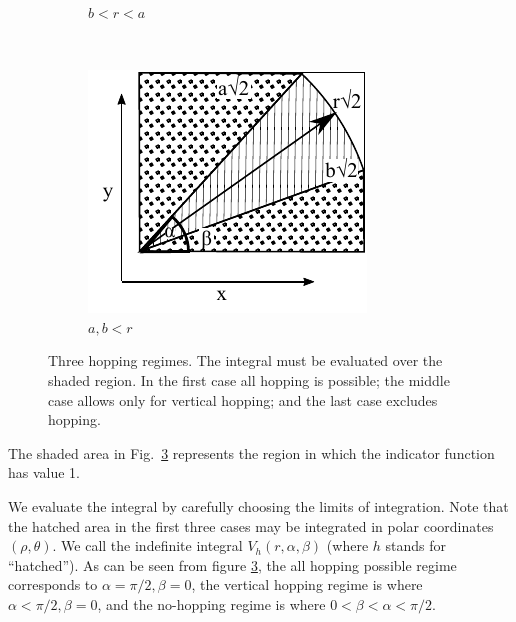 \documentclass[superscriptaddress,pre,reprint,showpacs,twocolumn]{revtex4-1}
\begin{document}
\begin{figure}[h]
\begin{subfigure}[b]{0.32\textwidth}
          \caption{$b<r<a$}
          \label{Caso2}
        \end{subfigure}%
        ~ %
        \begin{subfigure}[b]{0.32\textwidth}
          \centering
          \includegraphics[width=\textwidth]{figures/DiagramaIntegraCaso3.pdf}
          \caption{$a,b<r$}
          \label{Caso3}
        \end{subfigure}%
        \caption{Three hopping regimes. The integral must be evaluated over the shaded region.
In the first case all hopping is possible; the middle case
          allows only for vertical hopping; and the last case excludes hopping.}
\label{CasosIntegra}
\end{figure}
The shaded area in Fig.~\ref{CasosIntegra} represents the region in which the indicator function
has value 1. 

We evaluate the integral by carefully choosing the limits of integration. Note
that the hatched area in the first three cases may be integrated in polar coordinates $(\rho, \theta)$.
We call the indefinite integral $V_h(r,\alpha,\beta)$ (where $h$ stands for ``hatched'').
As can be seen from figure \ref{CasosIntegra}, the all hopping possible regime
corresponds to $\alpha = \pi/2, \beta=0$, the vertical hopping regime is where
$\alpha < \pi/2, \beta=0$, and the no-hopping regime is where $0 < \beta< \alpha < \pi/2$.
\end{document}
